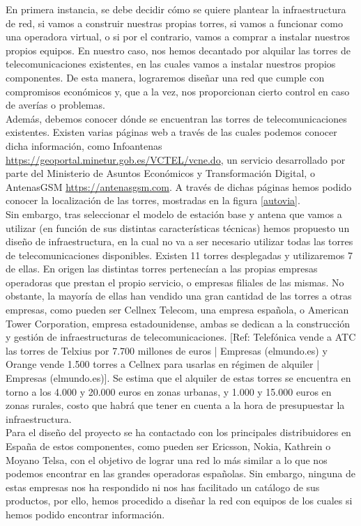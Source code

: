 En primera instancia, se debe decidir cómo se quiere plantear la infraestructura de red, si vamos a construir nuestras propias torres, si vamos a funcionar como una operadora virtual, o si por el contrario, vamos a comprar a instalar nuestros propios equipos. En nuestro caso, nos hemos decantado por alquilar las torres de telecomunicaciones existentes, en las cuales vamos a instalar nuestros propios componentes. De esta manera, lograremos diseñar una red que cumple con compromisos económicos y, que a la vez, nos proporcionan cierto control en caso de averías o problemas.\\

Además, debemos conocer dónde se encuentran las torres de telecomunicaciones existentes. Existen varias páginas web a través de las cuales podemos conocer dicha información, como Infoantenas \url{https://geoportal.minetur.gob.es/VCTEL/vcne.do}, un servicio desarrollado por parte del Ministerio de Asuntos Económicos y Transformación Digital, o AntenasGSM \url{https://antenasgsm.com}. A través de dichas páginas hemos podido conocer la localización de las torres, mostradas en la figura \ref{autovia}.\\

Sin embargo, tras seleccionar el modelo de estación base y antena que vamos a utilizar (en función de sus distintas características técnicas) hemos propuesto un diseño de infraestructura, en la cual no va a ser necesario utilizar todas las torres de telecomunicaciones disponibles. Existen 11 torres desplegadas y utilizaremos 7 de ellas. En origen las distintas torres pertenecían a las propias empresas operadoras que prestan el propio servicio, o empresas filiales de las mismas. No obstante, la mayoría de ellas han vendido una gran cantidad de las torres a otras empresas, como pueden ser Cellnex Telecom, una empresa española, o American Tower Corporation, empresa estadounidense, ambas se dedican a la construcción y gestión de infraestructuras de telecomunicaciones. [Ref: Telefónica vende a ATC las torres de Telxius por 7.700 millones de euros | Empresas (elmundo.es) y Orange vende 1.500 torres a Cellnex para usarlas en régimen de alquiler | Empresas (elmundo.es)]. Se estima que el alquiler de estas torres se encuentra en torno a los 4.000 y 20.000 euros en zonas urbanas, y 1.000 y 15.000 euros en zonas rurales, costo que habrá que tener en cuenta a la hora de presupuestar la infraestructura.\\

Para el diseño del proyecto se ha contactado con los principales distribuidores en España de estos componentes, como pueden ser Ericsson, Nokia, Kathrein o Moyano Telsa, con el objetivo de lograr una red lo más similar a lo que nos podemos encontrar en las grandes operadoras españolas. Sin embargo, ninguna de estas empresas nos ha respondido ni nos has facilitado un catálogo de sus productos, por ello, hemos procedido a diseñar la red con equipos de los cuales si hemos podido encontrar información. \\

